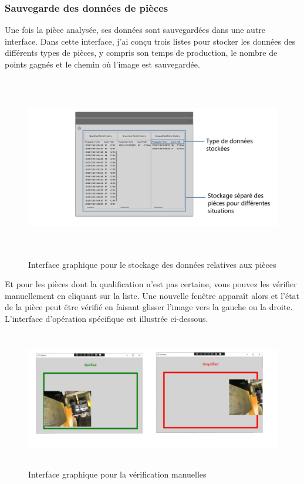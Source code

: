 \subsubsection{Sauvegarde des données de pièces}
Une fois la pièce analysée, ses données sont sauvegardées dans une autre interface. Dans cette interface, j'ai conçu trois listes pour stocker les données des différents types de pièces, y compris son temps de production, le nombre de points gagnés et le chemin où l'image est sauvegardée. 
\begin{figure}[H]
    \centering
    \includegraphics[height=8cm]{ressources/images/check_parts.png}
    \caption{Interface graphique pour le stockage des données relatives aux pièces}
\end{figure}

Et pour les pièces dont la qualification n'est pas certaine, vous pouvez les vérifier manuellement en cliquant sur la liste. Une nouvelle fenêtre apparaît alors et l'état de la pièce peut être vérifié en faisant glisser l'image vers la gauche ou la droite. L'interface d'opération spécifique est illustrée ci-dessous.
\begin{figure}[H]
    \centering
    \includegraphics[height=6cm]{ressources/images/check_manuel.png}
    \caption{Interface graphique pour la vérification manuelles}
\end{figure}

